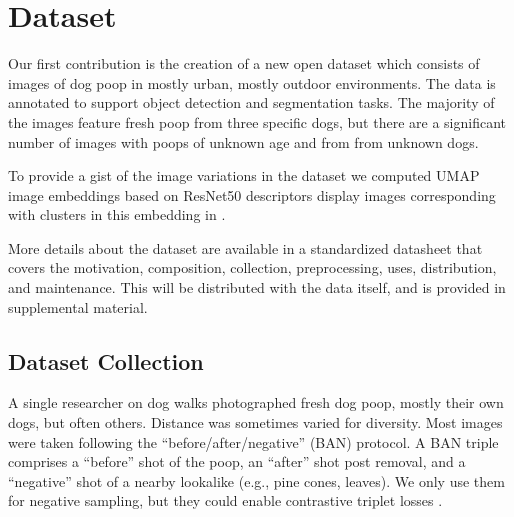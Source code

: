 \documentclass{article}
\begin{document}


\section{Dataset}
\label{sec:dataset}

Our first contribution is the creation of a new open dataset which consists of images of dog poop in mostly
  urban, mostly outdoor environments.
The data is annotated to support object detection and segmentation tasks.
The majority of the images feature fresh poop from three specific dogs, but there are a significant number
  of images with poops of unknown age and from from unknown dogs.

To provide a gist of the image variations in the dataset we computed UMAP \cite{mcinnes_umap_2020} image
  embeddings based on ResNet50 \cite{he2016deep} descriptors display images
  corresponding with clusters in this embedding in .

More details about the dataset are available in a standardized datasheet
\cite{gebru_datasheets_2021} that covers the motivation, composition,
collection, preprocessing, uses, distribution, and maintenance. This will be
distributed with the data itself, and is provided in supplemental material.

\subsection{Dataset Collection}

A single researcher on dog walks photographed fresh dog poop, mostly their own
dogs, but often others. Distance was sometimes varied for diversity. Most
images were taken following the ``before/after/negative'' (BAN) protocol.  
A BAN triple comprises a ``before'' shot of the poop, an ``after'' shot
post removal, and a ``negative'' shot of a nearby lookalike (e.g., pine cones,
leaves).  We only use them for negative sampling, but they could enable
contrastive triplet losses \cite{schroff_facenet_2015}.

\end{document}
